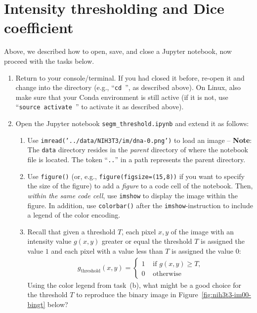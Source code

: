 \documentclass[12pt,a4paper]{article}
\begin{document}
\section{Intensity thresholding and Dice coefficient}
\label{task:threshold_segm}

Above, we described how to open, save, and close a Jupyter notebook, now proceed with the tasks below.
\begin{enumerate}
    \item Return to your console/terminal. If you had closed it before, re-open it and change into the \texttt{{\projectid}} directory (e.g., ``\texttt{cd {\projectid}}'', as described above). On Linux, also make sure that your Conda environment is still active (if it is not, use ``\texttt{source activate {\projectid}}'' to activate it as described above).
    \item Open the Jupyter notebook \texttt{segm\_threshold.ipynb} and extend it as follows:
    \begin{enumerate}
        \item Use \texttt{imread('../data/NIH3T3/im/dna-0.png')} to load an image -- \textbf{Note}: The \texttt{data} directory resides in the \emph{parent} directory of where the notebook file is located. The token ``\texttt{..}'' in a path represents the parent directory.
        \item Use \texttt{figure()} (or, e.g., \texttt{figure(figsize=(15,8))} if you want to specify the size of the figure) to add a \emph{figure} to a code cell of the notebook. Then, \emph{within the same code cell}, use \texttt{imshow} to display the image within the figure. In addition, use \texttt{colorbar()} after the \texttt{imshow}-instruction to include a legend of the color encoding.
        \item Recall that given a threshold $T$, each pixel $x,y$ of the image with an intensity value $g\left(x,y\right)$ greater or equal the threshold $T$ is assigned the value $1$ and each pixel with a value less than $T$ is assigned the value $0$:
        \begin{align*}
            g_\text{threshold}\left(x,y\right) = \begin{cases}
                1 & \text{ if $g\left(x,y\right) \geq T$,} \\
                0 & \text{ otherwise}
            \end{cases}
        \end{align*}
        Using the color legend from task~(b), what might be a good choice for the threshold $T$ to reproduce the binary image in Figure~\ref{fig:nih3t3-im00-bingt} below?

\end{enumerate}
\end{enumerate}
\end{document}
